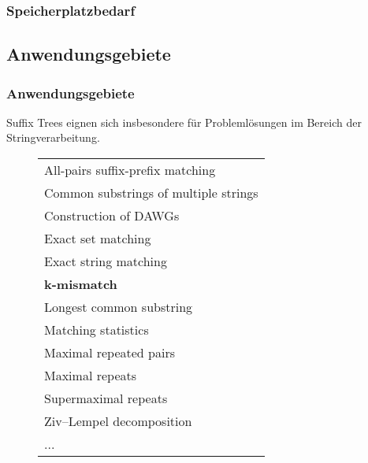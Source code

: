 \documentclass{beamer}
\begin{document}
\begin{frame}
\frametitle{Speicherplatzbedarf}
\end{frame}

\subsection{Anwendungsgebiete}

\begin{frame}
\frametitle{Anwendungsgebiete}
Suffix Trees eignen sich insbesondere für Problemlösungen im Bereich der Stringverarbeitung.
\begin{figure}
\begin{tabular}{l}
    \toprule
    All-pairs suffix-prefix matching      \\
    Common substrings of multiple strings \\
    Construction of DAWGs                 \\
    Exact set matching                    \\
    Exact string matching                 \\
    \textbf{k-mismatch}                   \\
    Longest common substring              \\
    Matching statistics                   \\
    Maximal repeated pairs                \\
    Maximal repeats                       \\
    Supermaximal repeats                  \\
    Ziv–Lempel decomposition              \\
    ...                                   \\
    \bottomrule
\end{tabular}
\end{figure}
\end{frame}

\end{document}
